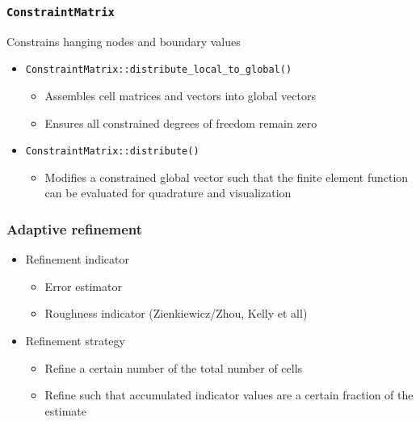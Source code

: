 \begin{frame}
  \frametitle{\lstinline!ConstraintMatrix!}
  Constrains hanging nodes and boundary values
  \begin{itemize}
  \item \lstinline!ConstraintMatrix::distribute_local_to_global()!
    \begin{itemize}
    \item Assembles cell matrices and vectors into global vectors
    \item Ensures all constrained degrees of freedom remain zero
    \end{itemize}
  \item \lstinline!ConstraintMatrix::distribute()!
    \begin{itemize}
    \item Modifies a constrained global vector such that the finite
      element function can be evaluated for quadrature and
      visualization
    \end{itemize}
  \end{itemize}
\end{frame}

\begin{frame}
  \frametitle{Adaptive refinement}
  \begin{itemize}
  \item Refinement indicator
    \begin{itemize}
    \item Error estimator
    \item Roughness indicator (Zienkiewicz/Zhou, Kelly et all)
    \end{itemize}
  \item Refinement strategy
    \begin{itemize}
    \item Refine a certain number of the total number of cells
    \item Refine such that accumulated indicator values are a certain
      fraction of the estimate
    \end{itemize}
  \end{itemize}
\end{frame}


